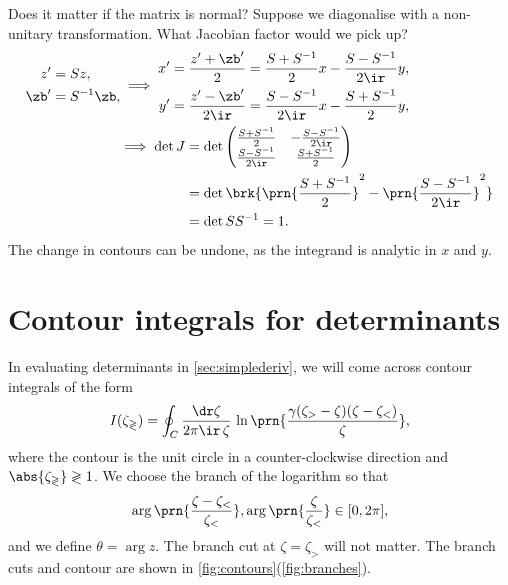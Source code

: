 \documentclass[12pt]{article}
\newcommand{\inv}{^{-1}}
\begin{document}
Does it matter if the matrix is normal?
Suppose we diagonalise with a non-unitary transformation.
What Jacobian factor would we pick up?
%
\begin{equation*}
\begin{aligned}
  \begin{aligned}
    z'   &= Sz, \\
    \zb' &=S\inv\zb,
  \end{aligned}
  &\implies
  \begin{aligned}
    x' &= \frac{z'+\zb'}{2}    = \frac{S+S\inv}{2}x - \frac{S-S\inv}{2\ir}y, \\
    y' &= \frac{z'-\zb'}{2\ir} = \frac{S-S\inv}{2\ir}x - \frac{S+S\inv}{2}y,
  \end{aligned}
  \\ &
  \begin{aligned}
  \implies  \det J &= \det\begin{pmatrix}
                    \frac{S+S\inv}{2}    & -\frac{S-S\inv}{2\ir} \\
                    \frac{S-S\inv}{2\ir} & \frac{S+S\inv}{2} \\
                  \end{pmatrix}
     \\
     &= \det \brk{\prn{\frac{S+S\inv}{2}}^2-\prn{\frac{S-S\inv}{2\ir}}^2}\\
     &=\det S S\inv = 1.
  \end{aligned}
\end{aligned}
\end{equation*}
%
The change in contours can be undone, as the integrand is analytic in $x$ and $y$.


\section{Contour integrals for determinants}\label{sec:contourints}

In evaluating determinants in \autoref{sec:simplederiv}, we will come across contour integrals of the form
%
\begin{equation}\label{eq:contourint}
  I(\zeta_\gtrless) = \oint_C \frac{\dr\zeta}{2\pi\ir\,\zeta} \, \ln\prn{\frac{\gamma(\zeta_>-\zeta)(\zeta-\zeta_<)}{\zeta}},
\end{equation}
%
where the contour is the unit circle in a counter-clockwise direction and $\abs{\zeta_\gtrless}\gtrless1$.
We choose the branch of the logarithm so that
%
\begin{equation}\label{eq:branch}
  \arg\prn{\frac{\zeta-\zeta_<}{\zeta_<}},\arg\prn{\frac{\zeta}{\zeta_<}} \in [0,2\pi],
\end{equation}
%
and we define $\theta=\arg z$.
The branch cut at $\zeta=\zeta_>$ will not matter.
The branch cuts and contour are shown in \autoref{fig:contours}(\ref{fig:branches}).
\end{document}
